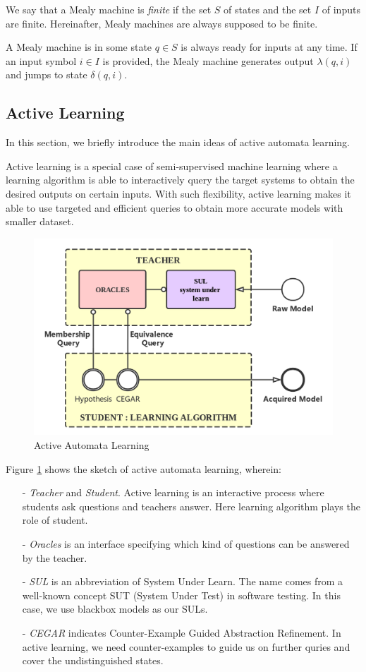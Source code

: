 \documentclass[conference, a4paper]{IEEEtran}
\begin{document}
We say that a Mealy machine is \emph{finite} if the set $S$ of states and the set $I$ of inputs are
finite. Hereinafter, Mealy machines are always supposed to be finite.

A Mealy machine is in some state $q\in S$ is always ready for inputs at any time. If an input symbol
$i\in I$ is provided, the Mealy machine generates output $\lambda(q,i)$ and jumps to state
$\delta(q,i)$.


\subsection{Active Learning}
In this section, we briefly introduce the main ideas of active automata learning. 

Active learning \cite{settles2010active} is a special case of semi-supervised machine learning where
a learning algorithm is able to interactively query the target systems to obtain the desired outputs
on certain inputs. With such flexibility, active learning makes it able to use targeted and efficient
queries to obtain more accurate models with smaller dataset. 


\begin{figure}[h]
  \begin{center}
    \includegraphics[width=.5\textwidth]{./images/activelearning.png}
  \end{center}
  \caption{Active Automata Learning}
  \label{fig:activelearning}
\end{figure}

Figure \ref{fig:activelearning} shows the sketch of active automata learning, wherein:
\begin{itemize}
  \item[-] \emph{Teacher} and \emph{Student}. Active learning is an interactive process where
    students ask questions and teachers answer. Here learning algorithm plays the role of student.
  \item[-] \emph{Oracles} is an interface specifying which kind of questions can be answered by the
    teacher.
  \item[-] \emph{SUL} is an abbreviation of System Under Learn. The name comes from a well-known
    concept SUT (System Under Test) in software testing. In this case, we use blackbox models as our
    SULs.
  \item[-] \emph{CEGAR} indicates Counter-Example Guided Abstraction
    Refinement\cite{DBLP:conf/cav/ClarkeGJLV00}. In active learning, we need counter-examples to
    guide us on further quries and cover the undistinguished states.
\end{itemize}
\end{document}
